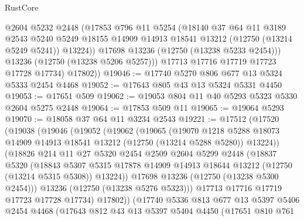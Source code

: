 \begin{lexlean}{RustCore}
\begin{coremodule}
              @2604
              @5232
              @2448
              (@17853
                @796
                @11
                @5254
                (@18140
                  @37
                  @64
                  @11
                  @3189
                  @2543
                  @5240
                  @5249
                  @18155
                  @14909
                  @14913
                  @18541
                  @13212
                  (@12750 (@13214 @5249 @5241))
                  @13224))
              @17698
              @13236
              (@12750 (@13238 @5233 @2454)))
            @13236
            (@12750 (@13238 @5206 @5257)))
          @17713
          @17716
          @17719
          @17723
          @17728
          @17734)
        @17802))
@19046 := @17740 @5270 @806 @677 @13 @5324 @5333 @2454 @4468
@19052 := @17643 @805 @43 @13 @5324 @5331 @4450
@19053 := @17651 @509
@19062 := @19053 @804 @11 @40 @5293 @5323 @5330 @2604 @5275 @2448
@19064 := @17853 @509 @11
@19065 := @19064 @5293
@19070 := @18058 @37 @64 @11 @3234 @2543
@19221 := @17512
    (@17520
      (@19038
        (@19046
          (@19052
            (@19062
              (@19065
                (@19070
                  @1218
                  @5288
                  @18073
                  @14909
                  @14913
                  @18541
                  @13212
                  (@12750 (@13214 @5288 @5280))
                  @13224))
              (@18826
                @214
                @11
                @27
                @5320
                @2454
                @2509
                @2604
                @5299
                @2448
                (@18837
                  @5320
                  (@18843
                    @5307
                    @5315
                    @17878
                    @14909
                    @14913
                    @18644
                    @13212
                    (@12750 (@13214 @5315 @5308))
                    @13224))
                @17698
                @13236
                (@12750 (@13238 @5300 @2454)))
              @13236
              (@12750 (@13238 @5276 @5323)))
            @17713
            @17716
            @17719
            @17723
            @17728
            @17734)
          @17802))
      (@17740
        @5336
        @813
        @677
        @13
        @5397
        @5406
        @2454
        @4468
        (@17643
          @812
          @43
          @13
          @5397
          @5404
          @4450
          (@17651
            @810
            @761

\end{coremodule}
\end{lexlean}
